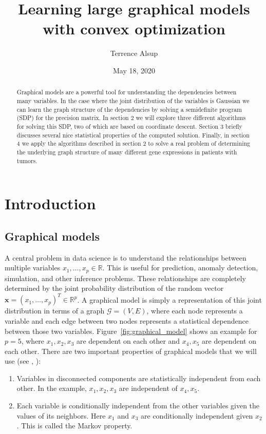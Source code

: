 \documentclass[10pt, letterpaper]{article}
\title{Learning large graphical models with convex optimization}
\author{Terrence Alsup}
\date{May 18, 2020}
\newcommand{\bx}{\boldsymbol x} %
\newcommand{\R}{\mathbb{R}} %
\begin{document}
\maketitle

\begin{abstract}
Graphical models are a powerful tool for understanding the dependencies between many variables.  In the case where the joint distribution of the variables is Gaussian we can learn the graph structure of the dependencies by solving a semidefinite program (SDP) for the precision matrix.  In section 2 we will explore three different algorithms for solving this SDP, two of which are based on coordinate descent.    Section 3 briefly discusses several nice statistical properties of the computed solution. Finally, in section 4 we apply the algorithms described in section 2 to solve a real problem of determining the underlying graph structure of many different gene expressions in patients with tumors.
\end{abstract}

\section{Introduction}

\subsection{Graphical models}

A central problem in data science is to understand the relationships between multiple variables $x_1,\ldots,x_p \in \R$.  This is useful for prediction, anomaly detection, simulation, and other inference problems.  These relationships are completely determined by the joint probability distribution of the random vector $\bx = (x_1,\ldots,x_p)^T \in \R^p$.  A graphical model is simply a representation of this joint distribution in terms of a graph $\mathcal{G} = (V, E)$, where each node represents a variable and each edge between two nodes represents a statistical dependence between those two variables.  Figure~\ref{fig:graphical_model} shows an example for $p=5$, where $x_1,x_2,x_3$ are dependent on each other and $x_4,x_5$ are dependent on each other.  There are two important properties of graphical models that we will use (see \cite{Bishop}, \cite{ESL}):
\begin{enumerate}
\item Variables in disconnected components are statistically independent from each other.  In the example, $x_1,x_2,x_3$ are independent of $x_4,x_5$.
\item Each variable is conditionally independent from the other variables given the values of its neighbors.  Here $x_1$ and $x_3$ are conditionally independent given $x_2$.  This is called the Markov property.
\end{enumerate}
\end{document}
